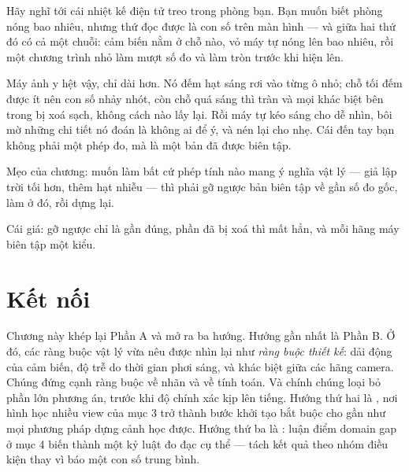 \documentclass[../../deep_learning.tex]{subfiles}
\begin{document}
\begin{dongian}
Hãy nghĩ tới cái nhiệt kế điện tử treo trong phòng bạn. Bạn muốn biết phòng nóng bao nhiêu, nhưng thứ đọc được là con số trên màn hình --- và giữa hai thứ đó có cả một chuỗi: cảm biến nằm ở chỗ nào, vỏ máy tự nóng lên bao nhiêu, rồi một chương trình nhỏ làm mượt số đo và làm tròn trước khi hiện lên.

Máy ảnh y hệt vậy, chỉ dài hơn. Nó đếm hạt sáng rơi vào từng ô nhỏ; chỗ tối đếm được ít nên con số nhảy nhót, còn chỗ quá sáng thì tràn và mọi khác biệt bên trong bị xoá sạch, không cách nào lấy lại. Rồi máy tự kéo sáng cho dễ nhìn, bôi mờ những chi tiết nó đoán là không ai để ý, và nén lại cho nhẹ. Cái đến tay bạn không phải một phép đo, mà là một bản đã được biên tập.

Mẹo của chương: muốn làm bất cứ phép tính nào mang ý nghĩa vật lý --- giả lập trời tối hơn, thêm hạt nhiễu --- thì phải gỡ ngược bản biên tập về gần số đo gốc, làm ở đó, rồi dựng lại.

Cái giá: gỡ ngược chỉ là gần đúng, phần đã bị xoá thì mất hẳn, và mỗi hãng máy biên tập một kiểu.

\end{dongian}

\section{Kết nối}
Chương này khép lại Phần A và mở ra ba hướng. Hướng gần nhất là Phần B. Ở đó, các ràng buộc vật lý vừa nêu được nhìn lại như \emph{ràng buộc thiết kế}: dải động của cảm biến, độ trễ do thời gian phơi sáng, và khác biệt giữa các hãng camera. Chúng đứng cạnh ràng buộc về nhãn và về tính toán. Và chính chúng loại bỏ phần lớn phương án, trước khi độ chính xác kịp lên tiếng. Hướng thứ hai là , nơi hình học nhiều view của mục 3 trở thành bước khởi tạo bắt buộc cho gần như mọi phương pháp dựng cảnh học được. Hướng thứ ba là : luận điểm domain gap ở mục 4 biến thành một kỷ luật đo đạc cụ thể --- tách kết quả theo nhóm điều kiện thay vì báo một con số trung bình.
\end{document}
